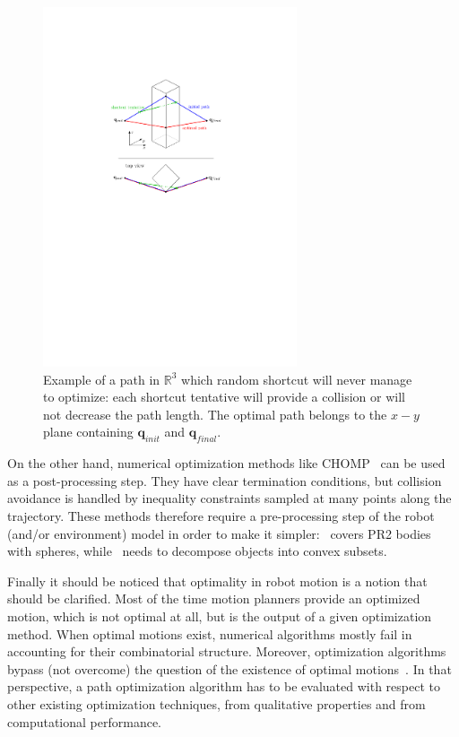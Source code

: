 \documentclass{tADR2e}
\newcommand\real{\mathbb{R}}
\newcommand\conf{\mathbf{q}}
\begin{document}
\begin{figure}
	\centering
	\includegraphics[width=7.5cm]{decoupled_DOF_optimization.pdf}
	\caption{Example of a path in $\real^3$ which random shortcut will never manage to 
	optimize: each shortcut tentative will provide a collision or will not 
	decrease the path length. The optimal path belongs to the $x-y$ plane 
	containing $\conf_{init}$ and $\conf_{final}$.}
	\label{decoupled_DOF_optimization}
\end{figure}

On the other hand, numerical
optimization methods like CHOMP~\cite{chompIjrr} can be used as a
post-processing step. They have clear termination conditions, but collision
avoidance is handled by inequality constraints sampled at many points along
the trajectory. These methods therefore require a pre-processing step of the
robot (and/or environment) model in order to make 
it simpler:~\cite{chompIjrr} covers PR2 bodies with spheres, 
while~\cite{convexOptimMotplan} needs to decompose objects into convex subsets.

Finally it should be noticed that optimality in robot motion is a notion that should be clarified. Most of the time motion planners provide an optimized motion, which is not optimal at all, but is the output of a given optimization method. When optimal motions exist, numerical
algorithms mostly fail in accounting for their combinatorial structure. Moreover, optimization algorithms bypass (not overcome) the question of the existence of optimal motions~\cite{LaumondOptim}. In that perspective, a path optimization algorithm has to be evaluated with respect to other existing optimization techniques, from qualitative properties and from computational performance.
\end{document}
